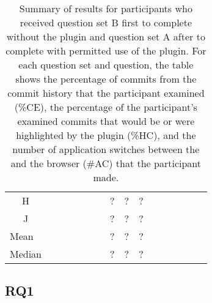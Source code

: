 \begin{landscape}
\begin{table}[p]
\begin{tabular}{@{}cccccccccccccccc@{}}
      H                          &       &       &       &                          &                          &                          & ?                        & ?                        & ?                        &      &                          &                          &                          &                          &                          \\
      J                          &       &       &       &                          &                          &                          & ?                        & ?                        & ?                        &      &                          &                          &                          &                          &                          \\ \midrule
      \multicolumn{1}{l}{Mean}   &       &       &       &                          &                          &                          & ?                        & ?                        & ?                        &      &                          &                          &                          &                          &                          \\
      \multicolumn{1}{l}{Median} &       &       &       &                          &                          &                          & ?                        & ?                        & ?                        &      &                          &                          &                          &                          &                          \\ \bottomrule
    \end{tabular}
    \caption{
      Summary of results for participants who received question set B first to complete without the plugin and question set A after to complete with permitted use of the plugin.
      For each question set and question, the table shows the percentage of commits from the commit history that the participant examined (\%CE), 
      the percentage of the participant's examined commits that would be or were highlighted by the plugin (\%HC),
      and the number of application switches between the  and the browser (\#AC) that the participant made.
    }
    \label{tab:Results-Quantitative-BA}
  \end{table}
  \end{landscape}

\subsection{RQ1}

